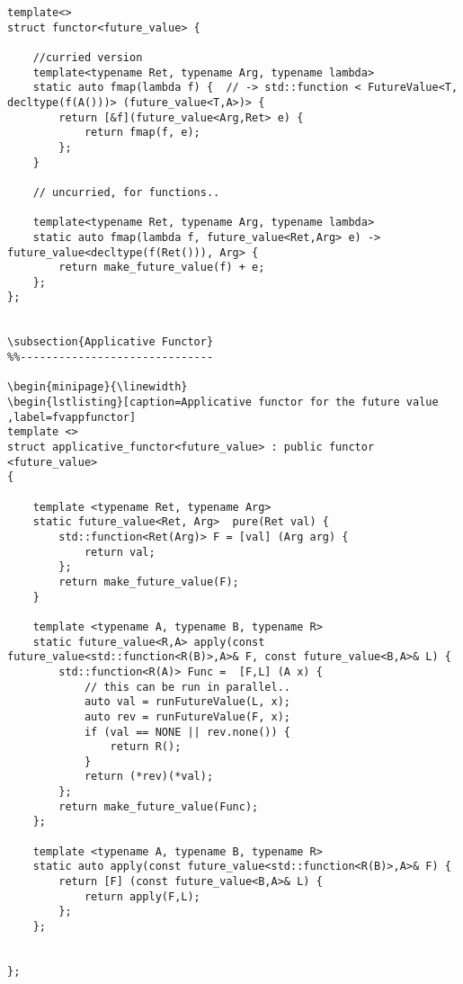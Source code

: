 \documentclass[12pt,fleqn]{article}
\begin{document}
\begin{minipage}{\linewidth}
\begin{lstlisting}[caption=Functor for the future value ,label=fvfunctor]
template<>
struct functor<future_value> {

	//curried version
	template<typename Ret, typename Arg, typename lambda>
	static auto fmap(lambda f) {  // -> std::function < FutureValue<T, decltype(f(A()))> (future_value<T,A>)> {
		return [&f](future_value<Arg,Ret> e) {
			return fmap(f, e);
		};
	}
	
	// uncurried, for functions..
	
	template<typename Ret, typename Arg, typename lambda>
	static auto fmap(lambda f, future_value<Ret,Arg> e) -> future_value<decltype(f(Ret())), Arg> {
		return make_future_value(f) + e;
	};
};


\subsection{Applicative Functor}
%%------------------------------

\begin{minipage}{\linewidth}
\begin{lstlisting}[caption=Applicative functor for the future value ,label=fvappfunctor]
template <> 
struct applicative_functor<future_value> : public functor <future_value>
{

	template <typename Ret, typename Arg> 
	static future_value<Ret, Arg>  pure(Ret val) {
		std::function<Ret(Arg)> F = [val] (Arg arg) {
			return val;
		};
		return make_future_value(F);
	}
	
	template <typename A, typename B, typename R>
	static future_value<R,A> apply(const future_value<std::function<R(B)>,A>& F, const future_value<B,A>& L) {
		std::function<R(A)> Func =  [F,L] (A x) {
			// this can be run in parallel..
			auto val = runFutureValue(L, x);
			auto rev = runFutureValue(F, x);
			if (val == NONE || rev.none()) {
				return R();
			}
			return (*rev)(*val);
		};
		return make_future_value(Func);
	};

	template <typename A, typename B, typename R>
	static auto apply(const future_value<std::function<R(B)>,A>& F) {
		return [F] (const future_value<B,A>& L) {
			return apply(F,L);
		};
	};
	

};
\end{lstlisting}
\end{minipage}
\end{document}
